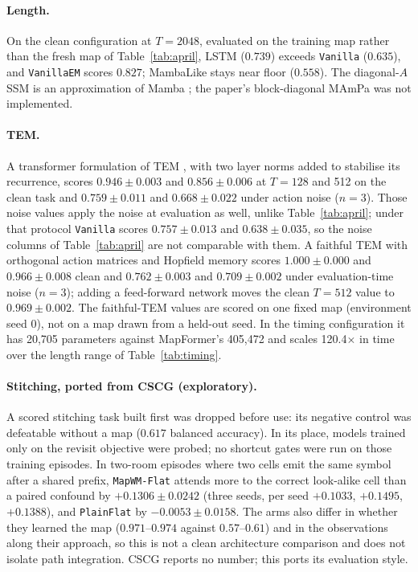 \documentclass[10pt]{article}
\newcommand{\arm}[1]{\texttt{#1}}
\begin{document}
\paragraph{Length.} On the clean configuration at $T=2048$, evaluated on the training map rather than the
fresh map of Table~\ref{tab:april}, LSTM ($0.739$) exceeds \arm{Vanilla} ($0.635$),
and \arm{VanillaEM} scores $0.827$; MambaLike stays near floor ($0.558$). The diagonal-$A$ SSM is an
approximation of Mamba \citep{gu2024mamba}; the paper's block-diagonal MAmPa was not implemented.

\paragraph{TEM.} A transformer formulation of TEM \citep{whittington2022temt}, with two layer norms added to
stabilise its recurrence, scores $0.946\pm0.003$ and $0.856\pm0.006$ at $T=128$ and 512 on the clean task and
$0.759\pm0.011$ and $0.668\pm0.022$ under action noise ($n=3$). Those noise values apply the noise at
evaluation as well, unlike Table~\ref{tab:april}; under that protocol \arm{Vanilla} scores $0.757\pm0.013$ and
$0.638\pm0.035$, so the noise columns of Table~\ref{tab:april} are not comparable with them. A faithful TEM with
orthogonal action matrices and Hopfield memory scores $1.000\pm0.000$ and $0.966\pm0.008$ clean and
$0.762\pm0.003$ and $0.709\pm0.002$ under evaluation-time noise ($n=3$); adding a feed-forward network moves the
clean $T=512$ value to $0.969\pm0.002$. The faithful-TEM values are scored on one fixed map (environment seed 0),
not on a map drawn from a held-out seed. In the timing configuration it
has 20,705 parameters against MapFormer's 405,472 and scales 120.4$\times$ in time over the length range of
Table~\ref{tab:timing}. %

\paragraph{Stitching, ported from CSCG (exploratory).} A scored stitching task built first was dropped before
use: its negative control was defeatable without a map ($0.617$ balanced accuracy). In its place, models trained
only on the revisit objective were probed; no shortcut gates were run on those training episodes. In two-room
episodes where two cells emit the same symbol after a shared prefix, \arm{MapWM-Flat} attends more to the
correct look-alike cell than a paired confound by $+0.1306\pm0.0242$ (three seeds, per seed $+0.1033$,
$+0.1495$, $+0.1388$), and \arm{PlainFlat} by $-0.0053\pm0.0158$. The arms also differ in whether they learned
the map ($0.971$--$0.974$ against $0.57$--$0.61$) and in the observations along their approach, so this is not a
clean architecture comparison and does not isolate path integration. CSCG \citep{george2021cscg} reports no number; this ports its evaluation
style. %
\end{document}
